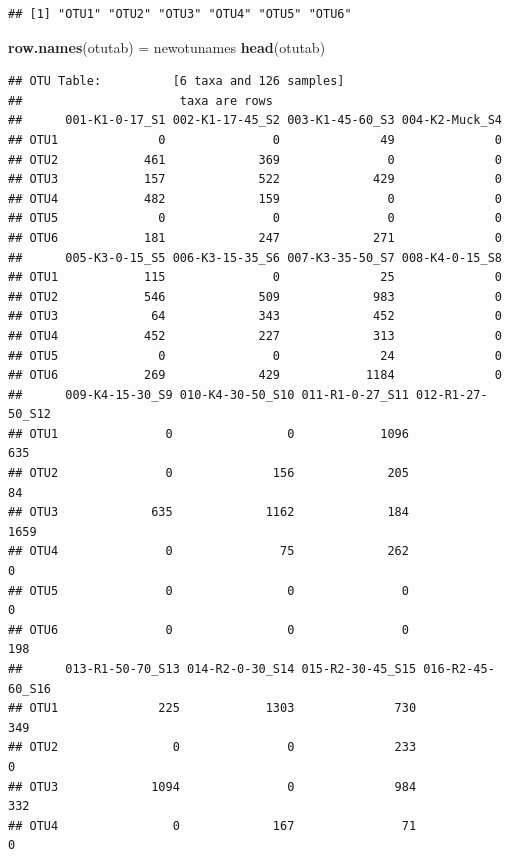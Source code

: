 \documentclass[]{article}
\newenvironment{Shaded}{\begin{snugshade}}{\end{snugshade}}
\newcommand{\KeywordTok}[1]{\textcolor[rgb]{0.13,0.29,0.53}{\textbf{#1}}}
\newcommand{\NormalTok}[1]{#1}
\newcommand{\StringTok}[1]{\textcolor[rgb]{0.31,0.60,0.02}{#1}}
\begin{document}
\begin{verbatim}
## [1] "OTU1" "OTU2" "OTU3" "OTU4" "OTU5" "OTU6"
\end{verbatim}

\begin{Shaded}
\begin{Highlighting}[]
\KeywordTok{row.names}\NormalTok{(otutab) =}\StringTok{ }\NormalTok{newotunames}
\KeywordTok{head}\NormalTok{(otutab)}
\end{Highlighting}
\end{Shaded}

\begin{verbatim}
## OTU Table:          [6 taxa and 126 samples]
##                      taxa are rows
##      001-K1-0-17_S1 002-K1-17-45_S2 003-K1-45-60_S3 004-K2-Muck_S4
## OTU1              0               0              49              0
## OTU2            461             369               0              0
## OTU3            157             522             429              0
## OTU4            482             159               0              0
## OTU5              0               0               0              0
## OTU6            181             247             271              0
##      005-K3-0-15_S5 006-K3-15-35_S6 007-K3-35-50_S7 008-K4-0-15_S8
## OTU1            115               0              25              0
## OTU2            546             509             983              0
## OTU3             64             343             452              0
## OTU4            452             227             313              0
## OTU5              0               0              24              0
## OTU6            269             429            1184              0
##      009-K4-15-30_S9 010-K4-30-50_S10 011-R1-0-27_S11 012-R1-27-50_S12
## OTU1               0                0            1096              635
## OTU2               0              156             205               84
## OTU3             635             1162             184             1659
## OTU4               0               75             262                0
## OTU5               0                0               0                0
## OTU6               0                0               0              198
##      013-R1-50-70_S13 014-R2-0-30_S14 015-R2-30-45_S15 016-R2-45-60_S16
## OTU1              225            1303              730              349
## OTU2                0               0              233                0
## OTU3             1094               0              984              332
## OTU4                0             167               71                0

\end{verbatim}
\end{document}
